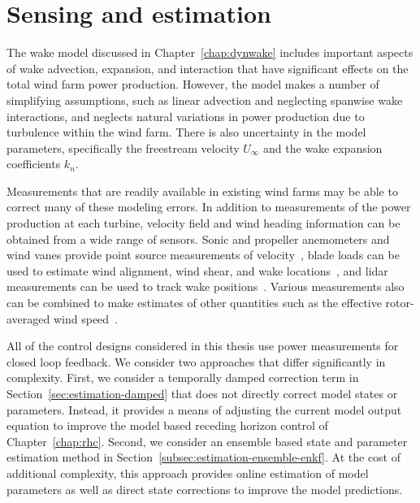 \chapter{Sensing and estimation}
\label{chap:estimation}

The wake model discussed in Chapter~\ref{chap:dynwake} includes important aspects of wake advection, expansion, and interaction that have significant effects on the total wind farm power production. However, the model makes a number of simplifying assumptions, such as linear advection and neglecting spanwise wake interactions, and neglects natural variations in power production due to turbulence within the wind farm. There is also uncertainty in the model parameters, specifically the freestream velocity $U_\infty$ and the wake expansion coefficients $k_n$. 

Measurements that are readily available in existing wind farms may be able to correct many of these modeling errors. In addition to measurements of the power production at each turbine, velocity field and wind heading information can be obtained from a wide range of sensors. Sonic and propeller anemometers and wind vanes provide point source measurements of velocity~\cite{Pao2011a}, blade loads can be used to estimate wind alignment, wind shear, and wake locations~\cite{Bottasso2014a, Bottasso2018a}, and lidar measurements can be used to track wake positions~\cite{Raach2016a, Churchfield2016a}. Various measurements also can be combined to make estimates of other quantities such as the effective rotor-averaged wind speed~\cite{Knudsen2011a}.

All of the control designs considered in this thesis use power measurements for closed loop feedback. We consider two approaches that differ significantly in complexity. First, we consider a temporally damped correction term in Section~\ref{sec:estimation-damped} that does not directly correct model states or parameters. Instead, it provides a means of adjusting the current model output equation to improve the model based receding horizon control of Chapter~\ref{chap:rhc}. Second, we consider an ensemble based state and parameter estimation method in Section~\ref{subsec:estimation-ensemble-enkf}. At the cost of additional complexity, this approach provides online estimation of model parameters as well as direct state corrections to improve the model predictions.

